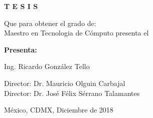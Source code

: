 \vfill
\begin{center}
    \Large\bfseries
   T E S I S
\end{center}

\vfill
\begin{center}
    \large
   Que para obtener el grado de: \\
Maestro en Tecnologia de C\'omputo  presenta el
\end{center}

\vfill
\begin{center}
    \large\bfseries
    Presenta:
    
   Ing. Ricardo Gonz\'alez Tello
\end{center}

\vfill\vfill\vfill
\begin{center}
    \large
    Director: Dr. Mauricio Olguin Carbajal\\
    Director: Dr. Jos\'e F\'elix S\'errano Talamantes
\end{center}

\vfill
\begin{center}
\large
    M\'exico, CDMX, \hfill Diciembre de 2018
\end{center}

\cleardoublepage



